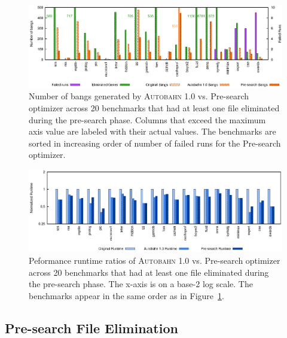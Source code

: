 \documentclass[format=sigplan, review=true, 9pt]{acmart}
\newcommand{\figref}[1]{Figure~\ref{#1}}
\newcommand{\scaption}[1]{\caption{#1}}
\newcommand{\Ao}[0]{\textsc{Autobahn 1.0}}
\newcommand{\preopt}[0]{pre-search}
\newcommand{\Preopt}[0]{Pre-search}
\begin{document}
\begin{figure}
\includegraphics[width=\textwidth]{pre-aut-bangs}
\scaption{Number of bangs generated by \Ao{} vs. \Preopt{} optimizer across 20 benchmarks that had at least
one file eliminated during the \preopt{} phase. Columns that exceed
the maximum axis value are labeled with their actual values. The
benchmarks are sorted in increasing order of number of failed runs for
the \Preopt{} optimizer.}
\label{fig:preopt-bangs}
\end{figure}

\begin{figure}
\includegraphics[width=\textwidth]{pre-aut}
\scaption{Peformance runtime ratios of \Ao{} vs. \Preopt{} optimizer
across 20 benchmarks that had at least one
file eliminated during the \preopt{} phase. The x-axis 
is on a base-2 log scale. The benchmarks appear in the same order as
in \figref{fig:preopt-bangs}.}
\label{fig:preopt-runtime}
\end{figure}

\subsection{\Preopt{} File Elimination}
\label{sec:file-elim}
\end{document}
